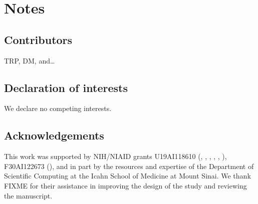 \section*{Notes}

\subsection*{Contributors}

TRP, DM, and…

\subsection*{Declaration of interests}

We declare no competing interests.

\subsection*{Acknowledgements}

This work was supported by NIH/NIAID grants U19AI118610 (, , , , , ), F30AI122673 (), and in part by the resources and expertise of the Department of Scientific Computing at the Icahn School of Medicine at Mount Sinai. We thank FIXME for their assistance in improving the design of the study and reviewing the manuscript.